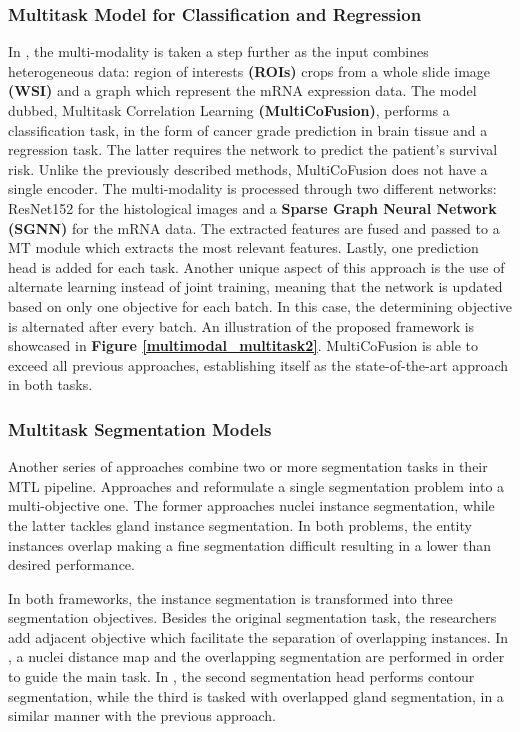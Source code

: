 \documentclass[conference]{IEEEtran}
\begin{document}
\subsubsection{Multitask Model for Classification and Regression}
\label{classification_reg_mt}
In \cite{tan2022multi}, the multi-modality is taken a step further as the input combines heterogeneous data: region of interests \textbf{(ROIs)} crops from a whole slide image \textbf{(WSI)} and a graph which represent the mRNA expression data. The model dubbed, Multitask
Correlation Learning \textbf{(MultiCoFusion)}, performs a classification task, in the form of cancer grade prediction in brain tissue and a regression task. The latter requires the network to predict the patient's survival risk. Unlike the previously described methods, MultiCoFusion does not have a single encoder. The multi-modality is processed through two different networks: ResNet152 for the histological images and a \textbf{Sparse Graph Neural Network (SGNN)} \cite{tan2021hierarchical} for the mRNA data. The extracted features are fused and passed to a MT module which extracts the most relevant features. Lastly, one prediction head is added for each task. Another unique aspect of this approach is the use of alternate learning instead of joint training, meaning that the network is updated based on only one objective for each batch. In this case, the determining objective is alternated after every batch.  An illustration of the proposed framework is showcased in \textbf{Figure \ref{multimodal_multitask2}}. MultiCoFusion is able to exceed all previous approaches, establishing itself as the state-of-the-art approach in both tasks.

\subsubsection{Multitask Segmentation Models}
\label{segmentatiopn_mt}

Another series of approaches combine two or more segmentation tasks in their MTL pipeline. Approaches \cite{wang2021bend} and \cite{rezazadeh2023multi} reformulate a single segmentation problem into a multi-objective one. The former approaches nuclei instance segmentation, while the latter tackles gland instance segmentation. In both problems, the entity instances overlap making a fine segmentation difficult resulting in a lower than desired performance. 

In both frameworks, the instance segmentation is transformed into three segmentation objectives. Besides the original segmentation task, the researchers add adjacent objective which facilitate the separation of overlapping instances. In \cite{wang2021bend}, a nuclei distance map and the overlapping segmentation are performed in order to guide the main task. In \cite{rezazadeh2023multi}, the second segmentation head performs contour segmentation, while the third is tasked with overlapped gland segmentation, in a similar manner with the previous approach. 
\end{document}
